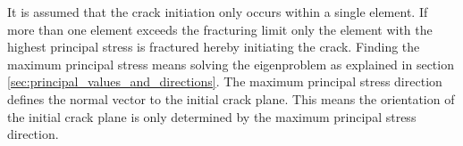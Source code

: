 It is assumed that the crack initiation only occurs within a single
element. If more than one element exceeds the fracturing limit only the
element with the highest principal stress is fractured hereby
initiating the crack. Finding the maximum principal stress means
solving the eigenproblem as explained in section
\vref{sec:principal_values_and_directions}. The maximum principal
stress direction defines the normal vector to the initial crack
plane. This means the orientation of the initial crack plane is only
determined by the maximum principal stress direction.


\begin{figure}[h]
\centering
     \\
\end{figure}
